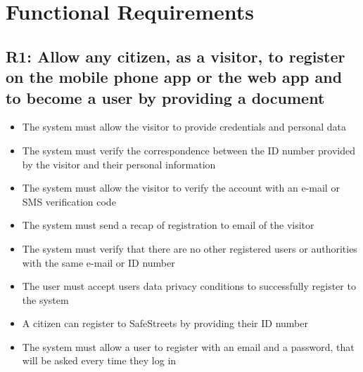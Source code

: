 \section{Functional Requirements}

\subsection{R1: Allow any citizen, as a visitor, to register on the mobile phone app or the web app and to become a user by providing a document}
\begin{itemize}
    \item The system must allow the visitor to provide credentials and personal data
    \item The system must verify the correspondence between the ID number provided by the visitor and their personal information
    \item The system must allow the visitor to verify the account with an e-mail or SMS verification code
    \item The system must send a recap of registration to email of the visitor
    \item The system must verify that there are no other registered users or authorities with the same e-mail or ID number
    \item The user must accept users data privacy conditions to successfully register to the system
    \item A citizen can register to SafeStreets by providing their ID number
    \item The system must allow a user to register with an email and a password, that will be asked every time they log in
\end{itemize}

